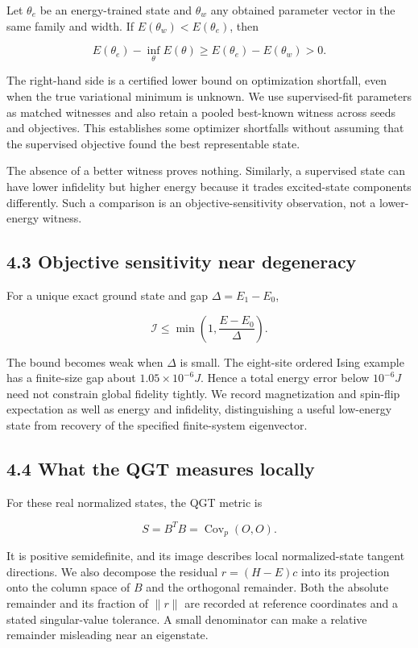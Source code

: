 \documentclass[
  11pt,
  a4paper,
]{article}
\begin{document}
Let \(\theta_e\) be an energy-trained state and \(\theta_w\) any
obtained parameter vector in the same family and width. If
\(E(\theta_w)<E(\theta_e)\), then

\[E(\theta_e)-\inf_\theta E(\theta)\ge E(\theta_e)-E(\theta_w)>0.\]

The right-hand side is a certified lower bound on optimization
shortfall, even when the true variational minimum is unknown. We use
supervised-fit parameters as matched witnesses and also retain a pooled
best-known witness across seeds and objectives. This establishes some
optimizer shortfalls without assuming that the supervised objective
found the best representable state.

The absence of a better witness proves nothing. Similarly, a supervised
state can have lower infidelity but higher energy because it trades
excited-state components differently. Such a comparison is an
objective-sensitivity observation, not a lower-energy witness.

\hypertarget{objective-sensitivity-near-degeneracy}{%
\subsection{4.3 Objective sensitivity near
degeneracy}\label{objective-sensitivity-near-degeneracy}}

For a unique exact ground state and gap \(\Delta=E_1-E_0\),

\[\mathcal I\le\min\left(1,\frac{E-E_0}{\Delta}\right).\]

The bound becomes weak when \(\Delta\) is small. The eight-site ordered
Ising example has a finite-size gap about \(1.05\times10^{-6}J\). Hence
a total energy error below \(10^{-6}J\) need not constrain global
fidelity tightly. We record magnetization and spin-flip expectation as
well as energy and infidelity, distinguishing a useful low-energy state
from recovery of the specified finite-system eigenvector.

\hypertarget{what-the-qgt-measures-locally}{%
\subsection{4.4 What the QGT measures
locally}\label{what-the-qgt-measures-locally}}

For these real normalized states, the QGT metric is

\[S=B^TB=\operatorname{Cov}_p(O,O).\]

It is positive semidefinite, and its image describes local
normalized-state tangent directions. We also decompose the residual
\(r=(H-E)c\) into its projection onto the column space of \(B\) and the
orthogonal remainder. Both the absolute remainder and its fraction of
\(\|r\|\) are recorded at reference coordinates and a stated
singular-value tolerance. A small denominator can make a relative
remainder misleading near an eigenstate.
\end{document}
